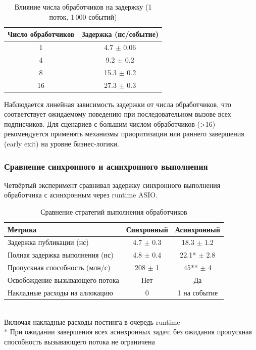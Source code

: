 \begin{table}[H]
\centering
\caption{Влияние числа обработчиков на задержку (1 поток, 1\,000 событий)}
\label{tab:handler_scaling}
\begin{tabular}{cc}
\toprule
\textbf{Число обработчиков} & \textbf{Задержка (нс/событие)} \\
\midrule
1 & 4.7 $\pm$ 0.06 \\
4 & 9.2 $\pm$ 0.2 \\
8 & 15.3 $\pm$ 0.2 \\
16 & 27.3 $\pm$ 0.3 \\
\bottomrule
\end{tabular}
\end{table}

Наблюдается линейная зависимость задержки от числа обработчиков, что соответствует ожидаемому поведению при последовательном вызове всех подписчиков. Для сценариев с большим числом обработчиков (>16) рекомендуется применять механизмы приоритизации или раннего завершения (early exit) на уровне бизнес-логики.

\subsubsection{Сравнение синхронного и асинхронного выполнения}

Четвёртый эксперимент сравнивал задержку синхронного выполнения обработчика с асинхронным через runtime ASIO.

\begin{table}[H]
\centering
\caption{Сравнение стратегий выполнения обработчиков}
\label{tab:sync_vs_async}
\begin{tabular}{lcc}
\toprule
\textbf{Метрика} & \textbf{Синхронный} & \textbf{Асинхронный} \\
\midrule
Задержка публикации (нс) & 4.7 $\pm$ 0.3 & 18.3 $\pm$ 1.2 \\
Полная задержка выполнения (нс) & 4.8 $\pm$ 0.4 & 22.1* $\pm$ 2.8 \\
Пропускная способность (млн/с) & 208 $\pm$ 1 & 45** $\pm$ 4 \\
Освобождение вызывающего потока & Нет & Да \\
Накладные расходы на аллокацию & 0 & 1 на событие \\
\bottomrule
\end{tabular}
\smallskip\\
\footnotesize * Включая накладные расходы постинга в очередь runtime \\
\footnotesize ** При ожидании завершения всех асинхронных задач; без ожидания пропускная способность вызывающего потока не ограничена
\end{table}

